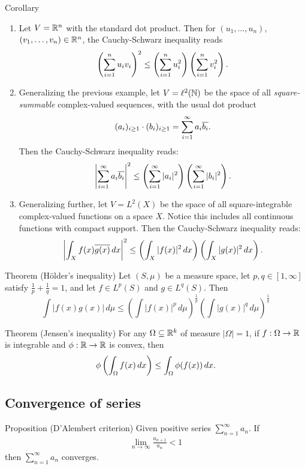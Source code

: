 \begin{thmbox}{Corollary}
    \begin{enumerate}
        \item Let $V = \mathbb{R}^n$ with the standard dot product. Then for $(u_1, \ldots, u_n)$, $(v_1, \ldots, v_n) \in \mathbb{R}^n$, the Cauchy-Schwarz inequality reads
        $$ \left( \sum_{i=1}^n u_i v_i\right)^2 \leq \left( \sum_{i=1}^n u_i^2\right)\left( \sum_{i=1}^n v_i^2\right). $$

        \item Generalizing the previous example, let $V = \ell^2(\mathbb{N})$ be the space of all \emph{square-summable} complex-valued sequences, with the usual dot product
        $$ (a_i)_{i\ge 1} \cdot (b_i)_{i\ge 1} = \sum_{i=1}^\infty a_i \overline{b_i}. $$
        Then the Cauchy-Schwarz inequality reads:
        $$ \left\lvert \sum_{i=1}^\infty a_i \overline{b_i}\right\rvert^2 \leq \left( \sum_{i=1}^\infty |a_i|^2\right) \left( \sum_{i=1}^\infty |b_i|^2\right). $$

        \item Generalizing further, let $V = L^2(X)$ be the space of all square-integrable complex-valued functions on a space $X$. Notice this includes all continuous functions with compact support. Then the Cauchy-Schwarz inequality reads:
        $$ \left\lvert \int_X f(x) \overline{g(x)} \,dx\right\rvert^2 \leq \left( \int_X |f(x)|^2 \,dx\right) \left( \int_X |g(x)|^2 \,dx\right). $$
    \end{enumerate}
\end{thmbox}

\begin{thmbox}{Theorem (Hölder's inequality)}
Let $(S, \mu)$ be a measure space, let $p, q \in [1,\infty]$ satisfy $\frac{1}{p} + \frac{1}{q} = 1$, and let $f \in L^p(S)$ and $g \in L^q(S)$. Then
$$ \int |f(x)g(x)| \,d\mu \leq \left( \int |f(x)|^p \,d\mu \right)^{\frac{1}{p}} \left( \int |g(x)|^q \,d\mu \right)^{\frac{1}{q}} $$
\end{thmbox}

\begin{thmbox}{Theorem (Jensen's inequality)}
For any $\Omega \subseteq \mathbb{R}^k$ of measure $|\Omega| = 1$, if $f: \Omega \to \mathbb{R}$ is integrable and $\phi: \mathbb{R} \to \mathbb{R}$ is convex, then
$$ \phi\left( \int_\Omega f(x) \,dx\right) \leq \int_\Omega \phi(f(x)) \,dx. $$
\end{thmbox}

\subsection{Convergence of series}
\begin{thmbox}{Proposition (D'Alembert criterion)}
Given positive series $\displaystyle{\sum_{n=1}^\infty} a_n$. If
\begin{align*}
    \lim_{n \to \infty} \frac{a_{n+1}}{a_n}<1
\end{align*}
then $\displaystyle{\sum_{n=1}^\infty}a_n$ converges.
\end{thmbox}

